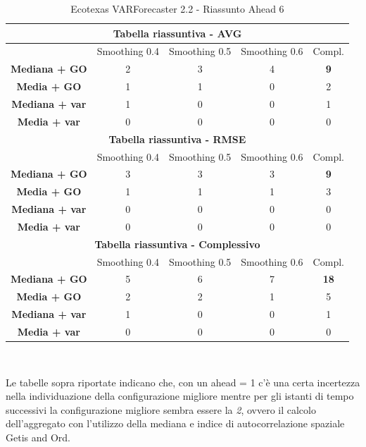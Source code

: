 \documentclass[12pt,a4paper,oneside,openright]{book}
\begin{document}
\medskip
\begin{table}[H]
\centering
\begin{tabular}{|c|c|c|c|c|}
\hline
\multicolumn{5}{|c|}{\textbf{Tabella riassuntiva - AVG}} \\
\hline
& Smoothing 0.4 & Smoothing 0.5 & Smoothing 0.6 & Compl.\\
\hline
\textbf{Mediana + GO} & 2 & 3 & 4 & \textbf{9}\\ 
\hline
\textbf{Media + GO} & 1 & 1 & 0 & 2\\ 
\hline
\textbf{Mediana + var} & 1 & 0 & 0 & 1\\ 
\hline
\textbf{Media + var} & 0 & 0 & 0 & 0\\ 
\hline
\multicolumn{5}{|c|}{\textbf{Tabella riassuntiva - RMSE}} \\
\hline
& Smoothing 0.4 & Smoothing 0.5 & Smoothing 0.6 & Compl.\\
\hline
\textbf{Mediana + GO} & 3 & 3 & 3 & \textbf{9}\\ 
\hline
\textbf{Media + GO} & 1 & 1 & 1 & 3\\ 
\hline
\textbf{Mediana + var} & 0 & 0 & 0 & 0\\ 
\hline
\textbf{Media + var} & 0 & 0 & 0 & 0\\ 
\hline
\multicolumn{5}{|c|}{\textbf{Tabella riassuntiva - Complessivo}} \\
\hline
& Smoothing 0.4 & Smoothing 0.5 & Smoothing 0.6 & Compl.\\
\hline
\textbf{Mediana + GO} & 5 & 6 & 7 & \textbf{18}\\ 
\hline
\textbf{Media + GO} & 2 & 2 & 1 & 5\\ 
\hline
\textbf{Mediana + var} & 1 & 0 & 0 & 1\\ 
\hline
\textbf{Media + var} & 0 & 0 & 0 & 0\\ 
\hline
\end{tabular} \\
\caption{Ecotexas VARForecaster 2.2 - Riassunto Ahead 6}
\end{table}

Le tabelle sopra riportate indicano che, con un ahead = 1 c'è una certa incertezza nella individuazione della configurazione migliore mentre per gli istanti di tempo successivi la configurazione migliore sembra essere la \textit{2}, ovvero il calcolo dell'aggregato con l'utilizzo della mediana e indice di autocorrelazione spaziale Getis and Ord. \\

\medskip
\end{document}
